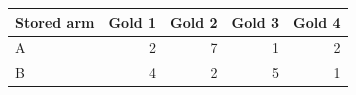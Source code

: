 \begin{tabular}{@{}lrrrr@{}}
\toprule
Stored arm & Gold 1 & Gold 2 & Gold 3 & Gold 4\\
\midrule
A & 2 & 7 & 1 & 2\\
B & 4 & 2 & 5 & 1\\
\bottomrule
\end{tabular}
